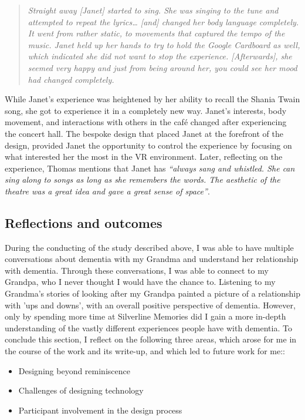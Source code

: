 \begin{quote}
\textit{Straight away [Janet] started to sing. She was singing to the tune and attempted to repeat the lyrics… [and] changed her body language completely. It went from rather static, to movements that captured the tempo of the music. Janet held up her hands to try to hold the Google Cardboard as well, which indicated she did not want to stop the experience. [Afterwards], she seemed very happy and just from being around her, you could see her mood had changed completely.}    
\end{quote}

While Janet’s experience was heightened by her ability to recall the Shania Twain song, she got to experience it in a completely new way. Janet’s interests, body movement, and interactions with others in the café changed after experiencing the concert hall. The bespoke design that placed Janet at the forefront of the design, provided Janet the opportunity to control the experience by focusing on what interested her the most in the VR environment. Later, reflecting on the experience, Thomas mentions that Janet has \textit{``always sang and whistled. She can sing along to songs as long as she remembers the words. The aesthetic of the theatre was a great idea and gave a great sense of space''}.

\subsection{Reflections and outcomes}
\label{S1:ReflectionsOutcomes}
During the conducting of the study described above, I was able to have multiple conversations about dementia with my Grandma and understand her relationship with dementia. Through these conversations, I was able to connect to my Grandpa, who I never thought I would have the chance to. Listening to my Grandma's stories of looking after my Grandpa painted a picture of a relationship with 'ups and downs', with an overall positive perspective of dementia. However, only by spending more time at Silverline Memories did I gain a more in-depth understanding of the vastly different experiences people have with dementia. To conclude this section, I reflect on the following three areas, which arose for me in the course of the work and its write-up, and which led to future work for me::
\begin{itemize}
    \item Designing beyond reminiscence
    \item Challenges of designing technology
    \item Participant involvement in the design process
\end{itemize}

